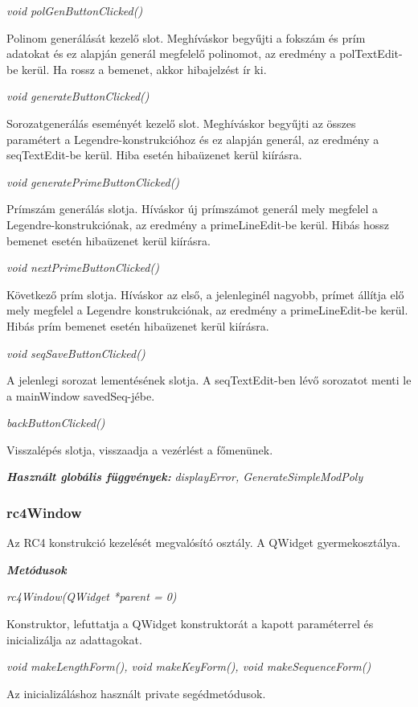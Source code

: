 \documentclass[hidelinks, 12pt]{article}
\begin{document}
\textit{void polGenButtonClicked()}

Polinom generálását kezelő slot. Meghíváskor begyűjti a fokszám és prím adatokat és ez alapján generál megfelelő polinomot, az eredmény a polTextEdit-be kerül. Ha rossz a bemenet, akkor hibajelzést ír ki.

\textit{void generateButtonClicked()}

Sorozatgenerálás eseményét kezelő slot. Meghíváskor begyűjti az összes paramétert a Legendre-konstrukcióhoz és ez alapján generál, az eredmény a seqTextEdit-be kerül. Hiba esetén hibaüzenet kerül kiírásra.

\textit{void generatePrimeButtonClicked()}

Prímszám generálás slotja. Híváskor új prímszámot generál mely megfelel a Legendre-konstrukciónak, az eredmény a primeLineEdit-be kerül. Hibás hossz bemenet esetén hibaüzenet kerül kiírásra.

\textit{void nextPrimeButtonClicked()}

Következő prím slotja. Híváskor az első, a jelenleginél nagyobb, prímet állítja elő mely megfelel a Legendre konstrukciónak, az eredmény a primeLineEdit-be kerül. Hibás prím bemenet esetén hibaüzenet kerül kiírásra.

\textit{void seqSaveButtonClicked()}

A jelenlegi sorozat lementésének slotja. A seqTextEdit-ben lévő sorozatot menti le a mainWindow savedSeq-jébe.

\textit{backButtonClicked()}

Visszalépés slotja, visszaadja a vezérlést a főmenünek.

\textbf{\textit{Használt globális függvények: }} \textit{displayError, GenerateSimpleModPoly}

\subsubsection*{rc4Window}

Az RC4 konstrukció kezelését megvalósító osztály. A QWidget gyermekosztálya.

\textit{\textbf{Metódusok}}

\textit{rc4Window(QWidget *parent = 0)}

Konstruktor, lefuttatja a QWidget konstruktorát a kapott paraméterrel és inicializálja az adattagokat.

\textit{void makeLengthForm(), void makeKeyForm(), void makeSequenceForm()}

Az inicializáláshoz használt private segédmetódusok.
\end{document}
